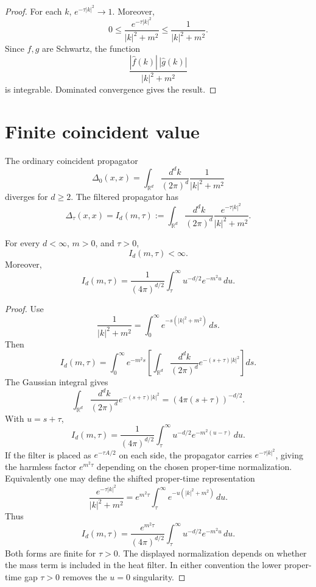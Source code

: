 \documentclass[11pt]{article}
\begin{document}
\begin{proof}
For each \(k\), \(e^{-\tau |k|^2}\to1\). Moreover,
\[
        0\le
        \frac{e^{-\tau |k|^2}}{|k|^2+m^2}
        \le
        \frac{1}{|k|^2+m^2}.
\]
Since \(f,g\) are Schwartz, the function
\[
        \frac{|\widehat f(k)|\,|\widehat g(k)|}{|k|^2+m^2}
\]
is integrable. Dominated convergence gives the result.
\end{proof}

\section{Finite coincident value}

The ordinary coincident propagator
\[
        \Delta_0(x,x)
        =
        \int_{\mathbb R^d}\frac{d^dk}{(2\pi)^d}\frac{1}{|k|^2+m^2}
\]
diverges for \(d\ge2\). The filtered propagator has
\[
        \Delta_\tau(x,x)
        =
        I_d(m,\tau)
        :=
        \int_{\mathbb R^d}
        \frac{d^dk}{(2\pi)^d}
        \frac{e^{-\tau |k|^2}}{|k|^2+m^2}.
\]

\begin{theorem}
For every \(d<\infty\), \(m>0\), and \(\tau>0\),
\[
        I_d(m,\tau)<\infty .
\]
Moreover,
\[
        I_d(m,\tau)
        =
        \frac{1}{(4\pi)^{d/2}}
        \int_{\tau}^{\infty}
        u^{-d/2}e^{-m^2u}\,du .
\]
\end{theorem}

\begin{proof}
Use
\[
        \frac{1}{|k|^2+m^2}
        =
        \int_0^\infty e^{-s(|k|^2+m^2)}\,ds.
\]
Then
\[
        I_d(m,\tau)
        =
        \int_0^\infty e^{-m^2s}
        \left[
        \int_{\mathbb R^d}
        \frac{d^dk}{(2\pi)^d}
        e^{-(s+\tau)|k|^2}
        \right]ds.
\]
The Gaussian integral gives
\[
        \int_{\mathbb R^d}
        \frac{d^dk}{(2\pi)^d}
        e^{-(s+\tau)|k|^2}
        =
        (4\pi(s+\tau))^{-d/2}.
\]
With \(u=s+\tau\),
\[
        I_d(m,\tau)
        =
        \frac{1}{(4\pi)^{d/2}}
        \int_{\tau}^{\infty}
        u^{-d/2}e^{-m^2(u-\tau)}\,du .
\]
If the filter is placed as \(e^{-\tau A/2}\) on each side, the propagator carries \(e^{-\tau |k|^2}\), giving the harmless factor \(e^{m^2\tau}\) depending on the chosen proper-time normalization. Equivalently one may define the shifted proper-time representation
\[
        \frac{e^{-\tau |k|^2}}{|k|^2+m^2}
        =
        e^{m^2\tau}
        \int_{\tau}^{\infty}
        e^{-u(|k|^2+m^2)}\,du.
\]
Thus
\[
        I_d(m,\tau)
        =
        \frac{e^{m^2\tau}}{(4\pi)^{d/2}}
        \int_{\tau}^{\infty}
        u^{-d/2}e^{-m^2u}\,du .
\]
Both forms are finite for \(\tau>0\). The displayed normalization depends on whether the mass term is included in the heat filter. In either convention the lower proper-time gap \(\tau>0\) removes the \(u=0\) singularity.
\end{proof}
\end{document}
